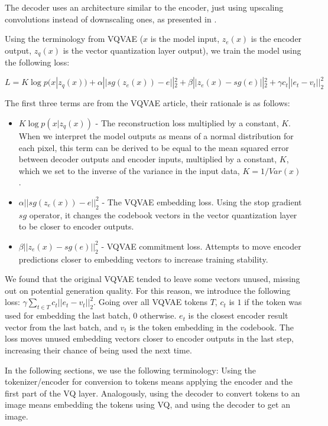 The decoder uses an architecture similar to the encoder, just using upscaling convolutions instead of downscaling ones, as presented in .



Using the terminology from VQVAE ($x$ is the model input, $z_e(x)$ is the encoder output, $z_q(x)$ is the vector quantization layer output), we train the model using the following loss:

$$L = K\log p(x|z_q(x)) + \alpha ||sg(z_e(x)) - e||_2^2 + \beta ||z_e(x) - sg(e)||_2^2 + \gamma c_t ||e_t - v_t||_2^2$$

The first three terms are from the VQVAE article, their rationale is as follows:

\begin{itemize}
\item $K\log p(x|z_q(x))$ - The reconstruction loss multiplied by a constant, $K$. When we interpret the model outputs as means of a normal distribution for each pixel, this term can be derived to be equal to the mean squared error between decoder outputs and encoder inputs, multiplied by a constant, $K$, which we set to the inverse of the variance in the input data, $K=1/Var(x)$.
\item $\alpha ||sg(z_e(x)) - e||_2^2$ - The VQVAE embedding loss. Using the stop gradient $sg$ operator, it changes the codebook vectors in the vector quantization layer to be closer to encoder outputs.
\item $\beta ||z_e(x) - sg(e)||_2^2$ - VQVAE commitment loss. Attempts to move encoder predictions closer to embedding vectors to increase training stability.
\end{itemize}

We found that the original VQVAE tended to leave some vectors unused, missing out on potential generation quality. For this reason, we introduce the following loss: $\gamma \sum_{t \in T} c_t ||e_t - v_t||_2^2$. Going over all VQVAE tokens $T$, $c_t$ is $1$ if the token was used for embedding the last batch, $0$ otherwise. $e_t$ is the closest encoder result vector from the last batch, and $v_t$ is the token embedding in the codebook. The loss moves unused embedding vectors closer to encoder outputs in the last step, increasing their chance of being used the next time.

In the following sections, we use the following terminology: Using the tokenizer/encoder for conversion to tokens means applying the encoder and the first part of the VQ layer. Analogously, using the decoder to convert tokens to an image means embedding the tokens using VQ, and using the decoder to get an image.



